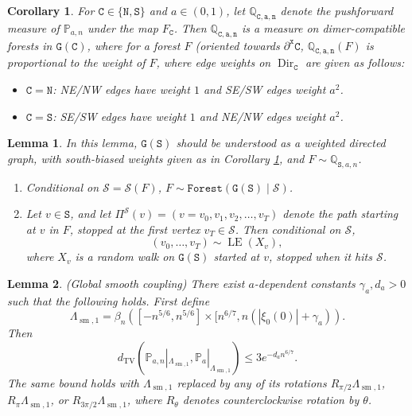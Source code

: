 \documentclass[10pt,a4paper]{amsart}
\newtheorem{cor}{Corollary}
\newtheorem{lem}{Lemma}
\renewcommand{\P}{\mathbb{P}}
\newcommand{\Q}{\mathbb{Q}}
\newcommand{\cS}{\mathcal{S}}
\renewcommand{\tt}[1]{{\mathtt{#1}}}
\begin{document}
	\begin{cor}
		\label{C:pushforward}
		For $\tt{C} \in \{\tt{N}, \tt{S}\}$ and $a \in (0, 1)$, let $\Q_\tt{C, a, n}$ denote the pushforward measure of $\P_{a, n}$ under the map $F_\tt{C}$. Then $\Q_\tt{C, a, n}$ is a measure on dimer-compatible forests in $\tt{G(C)}$, where for a forest $F$ (oriented towards $\partial^\tt{x} \tt{C}$, $\Q_\tt{C, a, n}(F)$ is proportional to the weight of $F$, where edge weights on $\operatorname{Dir}_\tt{C}$ are given as follows:
		\begin{itemize}[nosep]
			\item $\tt{C} = \tt{N}$: NE/NW edges have weight $1$ and SE/SW edges weight $a^2$.
			\item $\tt{C} = \tt{S}$: SE/SW edges have weight $1$ and NE/NW edges weight $a^2$.


		\end{itemize}
	\end{cor}

	\begin{lem}
		\label{L:simple-sample}
		In this lemma, $\tt{G}(\tt{S})$ should be understood as a weighted directed graph, with south-biased weights given as in Corollary \ref{C:pushforward}, and $F \sim \Q_{\tt{S}, a, n}$.
		\begin{enumerate}[label=\arabic*.]
			\item Conditional on $\cS = \cS(F)$, $F \sim \tt{Forest}(\tt{G}(\tt{S}) \mid \cS)$.
			\item Let $v \in \tt{S}$, and let $\Pi^\cS(v) = (v = v_0, v_1, v_2, \dots, v_T)$ denote the path starting at $v$ in $F$, stopped at the first vertex $v_T \in \cS$. Then conditional on $\cS$, 
			$$
			(v_0, \dots, v_T) \sim \operatorname{LE}(X_v),
			$$
			where $X_v$ is a random walk on $\tt{G}(\tt{S})$ started at $v$, stopped when it hits $\cS$.
		\end{enumerate} 
	\end{lem}

	\begin{lem} (Global smooth coupling)
		\label{L:global-coupling-1} 
	There exist $a$-dependent constants $\gamma_a, d_a > 0$ such that the following holds. First define
		$$
		\Lambda_{\operatorname{sm}, 1} = \beta_n([-n^{5/6} , n^{5/6}] \times [n^{6/7}, n(|\xi_0(0)| + \gamma_a)). 
		$$
		Then
		$$
		d_{\operatorname{TV}}(\P_{a, n}|_{\Lambda_{\operatorname{sm}, 1}}, \P_a|_{\Lambda_{\operatorname{sm}, 1}}) \le 3 e^{-d_a n^{6/7}}.
		$$
		The same bound holds with $\Lambda_{\operatorname{sm}, 1}$ replaced by any of its rotations $R_{\pi/2} \Lambda_{\operatorname{sm}, 1}$, $R_{\pi} \Lambda_{\operatorname{sm}, 1}$, or $R_{3\pi/2} \Lambda_{\operatorname{sm}, 1}$, where $R_\theta$ denotes counterclockwise rotation by $\theta$.
	\end{lem}
\end{document}
